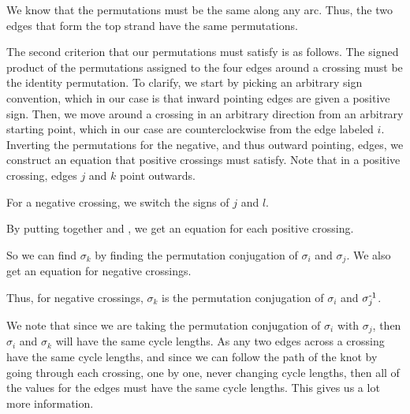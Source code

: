 \begin{paper}
We know that the permutations must be the same along any arc.
Thus, the two edges that form the top strand have the same permutations.


The second criterion that our permutations must satisfy is as follows.
The signed product of the permutations assigned to the four edges around a
crossing must be the identity permutation.
To clarify, we start by picking an arbitrary sign convention, which in our case
is that inward pointing edges are given a positive sign.
Then, we move around a crossing in an arbitrary direction from an arbitrary
starting point, which in our case are counterclockwise from the edge labeled
$i$.
Inverting the permutations for the negative, and thus outward pointing, edges,
we construct an equation that positive crossings must satisfy.
Note that in a positive crossing, edges $j$ and $k$ point outwards.

\begin{paperwhere}
\end{paperwhere}

For a negative crossing, we switch the signs of $j$ and $l$.


By putting together \eqUpper and \eqPositive, we get an equation for each
positive crossing.


So we can find $\sigma_k$ by finding the permutation conjugation of $\sigma_i$
and $\sigma_j$.
We also get an equation for negative crossings.


Thus, for negative crossings, $\sigma_k$ is the permutation conjugation of
$\sigma_i$ and $\sigma_j^{\text-1}$.


We note that since we are taking the permutation conjugation of $\sigma_i$ with
$\sigma_j$, then $\sigma_i$ and $\sigma_k$ will have the same cycle lengths.
As any two edges across a crossing have the same cycle lengths, and since we can
follow the path of the knot by going through each crossing, one by one, never
changing cycle lengths, then all of the values for the edges must have the same
cycle lengths.
This gives us a lot more information.


\end{paper}
